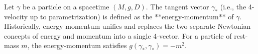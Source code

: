 Let $\gamma$ be a particle on a spacetime $(M, g, D)$. The tangent vector $\gamma_*$ (i.e., the 4-velocity up to parametrization) is defined as the **energy-momentum** of $\gamma$. Historically, energy-momentum unifies and replaces the two separate Newtonian concepts of energy and momentum into a single 4-vector. For a particle of rest-mass $m$, the energy-momentum satisfies $g(\gamma_*, \gamma_*) = -m^2$.
